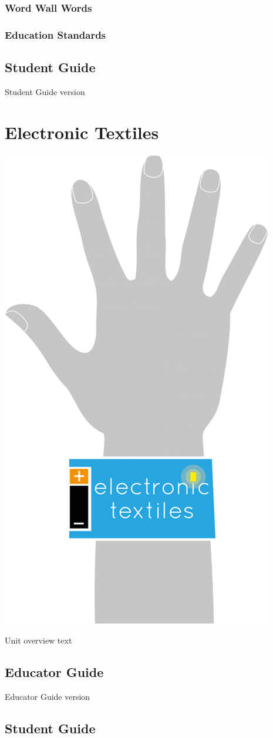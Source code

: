 \documentclass[]{book}
\begin{document}
\subsection*{Word Wall Words}\label{word-wall-words}

\subsection*{Education Standards}\label{education-standards}

\section{Student Guide}\label{student-guide}

Student Guide version

\chapter{Electronic Textiles}\label{electronic-textiles}

\begin{center}\includegraphics[width=0.3\linewidth]{img/electronicTextiles} \end{center}

Unit overview text

\section{Educator Guide}\label{educator-guide-1}

Educator Guide version

\section{Student Guide}\label{student-guide-1}
\end{document}
